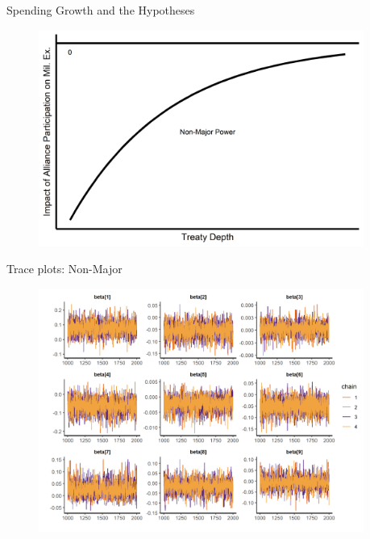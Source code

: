 \documentclass[12pt]{beamer}
\begin{document}

\begin{frame}{Spending Growth and the Hypotheses}

\begin{figure}
	\centering
		\includegraphics[width=0.95\textwidth]{illus-arg.png}
	\label{fig:illus-arg}
\end{figure}


\end{frame}



\begin{frame}{Trace plots: Non-Major}

\begin{figure}
	\centering
		\includegraphics[width=0.95\textwidth]{beta-trace-maj.png}
\end{figure}


\end{frame}
\end{document}
